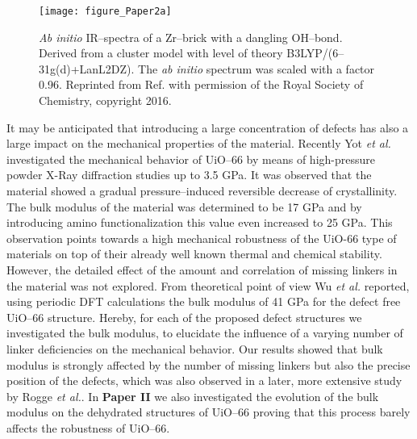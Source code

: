 \begin{figure}[!htp]
	\centering
	\texttt{[image: figure\_Paper2a]}
	\caption[\textit{Ab initio} IR--spectra of a Zr--brick with a dangling
	OH--bond. Derived from a cluster model with level of theory B3LYP/(6--31g(d)+
	LanL2DZ).
	The \textit{ab initio} spectrum was scaled with a factor 0.96.]{\textit{Ab initio} IR--spectra of a Zr--brick with a
	dangling OH--bond.
	Derived from a cluster model with level of theory B3LYP/(6--31g(d)+LanL2DZ).
	The \textit{ab initio} spectrum was scaled with a factor 0.96. Reprinted from
	Ref.\cite{Vandichel2016} with permission of the Royal Society of Chemistry,
	copyright 2016.}
	\label{fig:figure_Paper2a}
\end{figure}
\npar
\newpage
It may be anticipated that introducing a large
concentration of defects has also a large impact on the mechanical properties of the
material. Recently Yot \textit{et al.}\cite{Yot2016} investigated the
mechanical behavior of UiO--66 by means of high-pressure powder
X-Ray diffraction studies up to 3.5 GPa. It was observed that the
material showed a gradual pressure--induced reversible decrease of
crystallinity. The bulk modulus of the material was determined to be 17 GPa and
by introducing amino functionalization this value even 
increased to 25 GPa. This observation points
towards a high mechanical robustness of the UiO-66 type of materials on top of
their already well known thermal and chemical stability. However, the detailed
effect of the amount and correlation of missing linkers in the material was not
explored. From theoretical point of view Wu \textit{et al.}\cite{Wu2013} reported, using
periodic DFT calculations the bulk modulus of 41 GPa for the defect free UiO--66
structure. Hereby, for each of the proposed defect structures we investigated
the bulk modulus, to elucidate the influence of a varying number of linker
deficiencies on the mechanical behavior. Our results showed that bulk modulus is
strongly affected by the number of missing linkers but also the precise position
of the defects, which was also observed in a later, more extensive study by
Rogge \textit{et al.}\cite{Rogge2016}.
In \textbf{Paper II} we also investigated the evolution of the bulk modulus on
the dehydrated structures of UiO--66 proving that this process barely affects
the robustness of UiO--66.

\newpage

